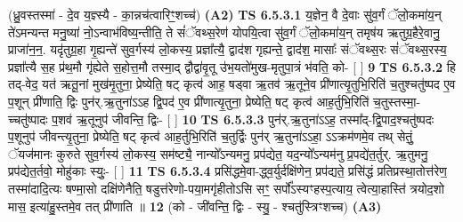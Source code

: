 \documentclass[17pt]{extarticle}
\begin{document}
                      (ध्रु॒वस्तस्मा॑ - दे॒व य॒ज्ञ्स्यै - का॒न्नच॑त्वारिꣳ॒॒शच्च॑)  \textbf{(A2)} \newline \newline
                                        \textbf{ TS 6.5.3.1} \newline
                  य॒ज्ञेन॒ वै दे॒वाः सु॑व॒र्गं ॅलो॒कमा॑य॒न् ते॑ऽमन्यन्त मनु॒ष्या॑ नो॒ऽन्वाभ॑विष्य॒न्तीति॒ ते सं॑ॅवथ्स॒रेण॑ योपयि॒त्वा सु॑व॒र्गं ॅलो॒कमा॑य॒न् तमृष॑य ऋतुग्र॒हैरे॒वानु॒ प्राजा॑न॒न॒. यदृ॑तुग्र॒हा गृ॒ह्यन्ते॑ सुव॒र्गस्य॑ लो॒कस्य॒ प्रज्ञा᳚त्यै॒ द्वाद॑श गृह्यन्ते॒ द्वाद॑श॒ मासाः᳚ संॅवथ्स॒रः सं॑ॅवथ्स॒रस्य॒ प्रज्ञा᳚त्यै स॒ह प्र॑थ॒मौ गृ॑ह्येते स॒होत्त॒मौ तस्मा॒द् द्वौद्वा॑वृ॒तू उ॑भ॒यतो॑मुख-मृतुपा॒त्रं भ॑वति॒ को- [  ] \textbf{  9} \newline
                  \newline
                                \textbf{ TS 6.5.3.2} \newline
                  हि तद्-वेद॒ यत॑ ऋतू॒नां मुख॑मृ॒तुना॒ प्रेष्येति॒ षट् कृत्व॑ आह॒ षड्वा ऋ॒तव॑ ऋ॒तूने॒व प्री॑णात्यृ॒तुभि॒रिति॑ च॒तुश्चतु॑ष्पद ए॒व प॒शून् प्री॑णाति॒ द्विः पुन॑र्.ऋ॒तुना॑ऽऽह द्वि॒पद॑ ए॒व प्री॑णात्यृ॒तुना॒ प्रेष्येति॒ षट् कृत्व॑ आह॒र्तुभि॒रिति॑ च॒तुस्तस्मा॒-च्चतु॑ष्पादः प॒शव॑ ऋ॒तूनुप॑ जीवन्ति॒ द्विः- [  ] \textbf{  10} \newline
                  \newline
                                \textbf{ TS 6.5.3.3} \newline
                  पुन॑र्.ऋ॒तुना॑ऽऽह॒ तस्मा᳚द्-द्वि॒पाद॒श्चतु॑ष्पदः प॒शूनुप॑ जीवन्त्यृ॒तुना॒ प्रेष्येति॒ षट् कृत्व॑ आह॒र्तुभि॒रिति॑ च॒तुर्द्विः पुन॑र् ऋ॒तुना॑ऽऽहा॒ ऽऽक्रम॑णमे॒व तथ् सेतुं॒ ॅयज॑मानः कुरुते सुव॒र्गस्य॑ लो॒कस्य॒ सम॑ष्ट्यै॒ नान्यो᳚ऽन्यमनु॒ प्रप॑द्येत॒ यद॒न्यो᳚ऽन्यम॑नु प्र॒पद्ये॑त॒र्तुर्. ऋ॒तुमनु॒ प्रप॑द्येत॒र्तवो॒ मोहु॑काः स्युः॒- [  ] \textbf{  11} \newline
                  \newline
                                \textbf{ TS 6.5.3.4} \newline
                  प्रसि॑द्धमे॒वा-द्ध्व॒र्युर्दक्षि॑णेन॒ प्रप॑द्यते॒ प्रसि॑द्धं प्रतिप्रस्था॒तोत्त॑रेण॒ तस्मा॑दादि॒त्यः षण्मा॒सो दक्षि॑णेनैति॒ षडुत्त॑रेणो-पया॒मगृ॑हीतोऽसि सꣳ॒॒ सर्पो᳚ऽस्यꣳहस्प॒त्याय॒ त्वेत्या॒हास्ति॑ त्रयोद॒शो मास॒ इत्या॑हु॒स्तमे॒व तत् प्री॑णाति ॥ \textbf{  12} \newline
                  \newline
                      (को - जी॑वन्ति॒ द्विः - स्यु॒ - श्चतु॑स्त्रिꣳशच्च)  \textbf{(A3)} \newline \newline
\end{document}
